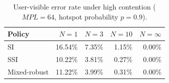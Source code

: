 \begin{table}[ht]
\centering
\caption{User-visible error rate under high contention ($MPL=64$, hotspot probability $p=0.9$).}
\label{tab:high-contention-error-rate}
\begin{tabular}{lrrrr}
\toprule
Policy & $N=1$ & $N=3$ & $N=10$ & $N=\infty$ \\
\midrule
SI & 16.54\% & 7.35\% & 1.15\% & 0.00\% \\
SSI & 10.22\% & 3.81\% & 0.27\% & 0.00\% \\
Mixed-robust & 11.22\% & 3.99\% & 0.31\% & 0.00\% \\
\bottomrule
\end{tabular}
\end{table}
